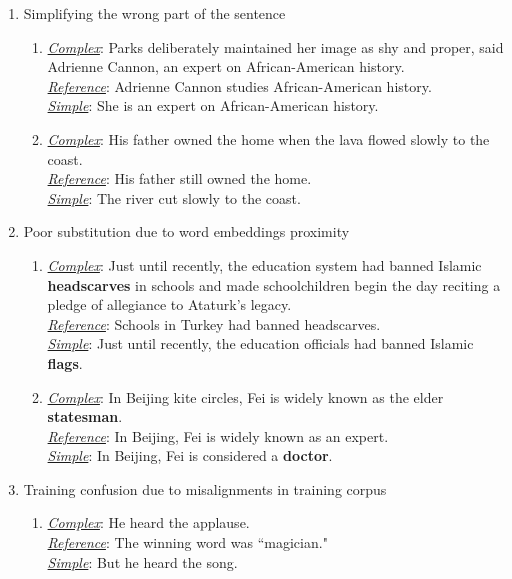 \documentclass[thesis.tex]{subfiles}
\begin{document}
\begin{enumerate}
\item{Simplifying the wrong part of the sentence}
\begin{enumerate}
\small
\item{\label{wrongpart1}} \underline{\it Complex}: Parks deliberately maintained her image as shy and proper, said Adrienne Cannon, an expert on African-American history.\\
\underline{\it Reference}: Adrienne Cannon studies African-American history.\\
\underline{\it Simple}: She is an expert on African-American history.

\item{\label{wrongpart2}}\underline{\it Complex}: His father owned the home when the lava flowed slowly to the coast.\\
\underline{\it Reference}: His father still owned the home.\\
\underline{\it Simple}: The river cut slowly to the coast.\\
\end{enumerate}

\item{Poor substitution due to word embeddings proximity}
\begin{enumerate}
\small
\item{\label{badsub1}} \underline{\it Complex}: Just until recently, the education system had banned Islamic \textbf{headscarves} in schools and made schoolchildren begin the day reciting a pledge of allegiance to Ataturk's legacy.\\
\underline{\it Reference}: Schools in Turkey had banned headscarves.\\
\underline{\it Simple}: Just until recently, the education officials had banned  Islamic \textbf{flags}.
\item {\label{badsub2}} \underline{\it Complex}: In Beijing kite circles, Fei is widely known as the elder \textbf{statesman}.\\
\underline{\it Reference}: In Beijing, Fei is widely known as an expert.\\
\underline{\it Simple}: In Beijing, Fei is considered a \textbf{doctor}.
\end{enumerate}

\item{Training confusion due to misalignments in training corpus}
\begin{enumerate}
\small
\item {\label{badalignment1}} \underline{\it Complex}: He heard the applause.\\
\underline{\it Reference}: The winning word was ``magician."\\
\underline{\it Simple}: But he heard the song.


\end{enumerate}
\end{enumerate}
\end{document}
